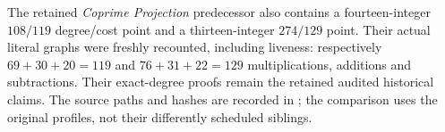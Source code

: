 The retained \emph{Coprime Projection} predecessor also contains a
fourteen-integer $108/119$ degree/cost point and a thirteen-integer $274/129$
point. Their actual literal graphs were freshly recounted, including liveness:
respectively $69+30+20=119$ and $76+31+22=129$ multiplications, additions
and subtractions. Their exact-degree proofs remain the retained audited
historical claims. The source paths and hashes are recorded in
; the comparison uses the
original  profiles, not their differently scheduled siblings.
